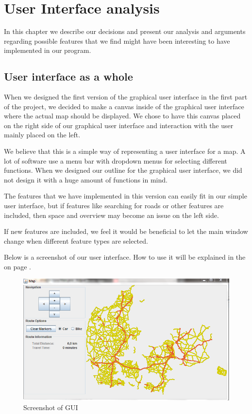 \chapter{User Interface analysis}
\label{UIA}
In this chapter we describe our decisions and present our analysis and
arguments regarding possible features that we find might have been interesting
to have implemented in our  program.

\section{User interface as a whole}
\label{UIA-UIW}
When we designed the first version of the graphical user interface in the first
part of the project, we decided to make a canvas inside of the graphical user
interface where the actual map should be displayed. We chose to have this
canvas placed on the right side of our graphical user interface and interaction
with the user mainly placed on the left.

We believe that this is a simple way of representing a user interface for a map.
A lot of software use a menu bar with dropdown menus for selecting different
functions. When we designed our outline for the graphical user interface, we did
not design it with a huge amount of functions in mind. 

The features that we have implemented in this version can easily fit in our
simple user interface, but if features like searching for roads or other
features are included, then space and overview may become an issue on the left side.

If new features are included, we feel it would be beneficial to let the main
window change when different feature types are selected.

Below is a screenshot of our user interface. How to use it will be
explained in the  on page \pageref{MAN}.

\begin{figure}[!ht]
\centering
\includegraphics[width=1\linewidth]{images/PictureOfUI}
\caption{Screenshot of GUI}
\label{UIA-UIW-PIC}
\end{figure}

